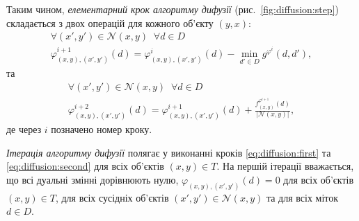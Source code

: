 Таким чином, \textit{елементарний крок алгоритму дифузії}
(рис.~\ref{fig:diffusion:step})
складається з двох операцій для кожного об'єкту $\left(y, x \right)$:
\begin{equation}\label{eq:diffusion:first}
\begin{gathered}
    \forall \left( x', y' \right) \in \mathcal{N} \left(x, y\right) \; \;
    \forall d \in D \\
    \varphi_{\left(x, y \right), \left(x', y' \right)}^{i + 1} \left( d \right)
    = \varphi_{\left(x, y \right), \left(x', y' \right)}^i \left( d \right)
    - \min \limits_{d' \in D}
        g^{\varphi^i} \left(d, d' \right),
\end{gathered}
\end{equation}
та
\begin{equation}\label{eq:diffusion:second}
\begin{gathered}
    \forall \left( x', y' \right) \in \mathcal{N} \left(x, y\right) \; \;
    \forall d \in D \\
    \varphi_{\left(x, y \right), \left(x', y' \right)}^{i + 2} \left( d \right)
    = \varphi_{\left(x, y \right), \left(x', y' \right)}^{i + 1} \left( d \right)
    + \frac{f_{\left(x, y \right)}^{\varphi^{i + 1}} \left(d \right)}{\left| \mathcal{N} \left(x, y \right)\right|},
\end{gathered}
\end{equation}
де через $i$ позначено номер кроку.

\textit{Ітерація алгоритму дифузії}
полягає у виконанні кроків \eqref{eq:diffusion:first}
та \eqref{eq:diffusion:second} для всіх об'єктів $\left( x, y \right) \in T$.
На першій ітерації вважається, що всі дуальні змінні дорівнюють нулю,
$\varphi_{\left(x, y \right), \left(x', y' \right)} \left( d \right) = 0$
для всіх об'єктів $\left(x, y \right) \in T$,
для всіх сусідніх об'єктів
$\left(x', y' \right) \in \mathcal{N} \left(x, y \right)$
та для всіх міток $d \in D$.

